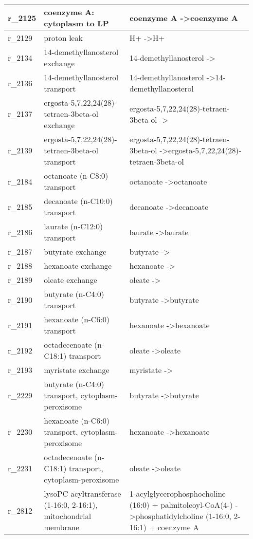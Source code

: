 \begin{landscape}
{\begin{longtable}{|l|p{7cm}|p{15cm}|}
r\_2125 & coenzyme A: cytoplasm to LP & coenzyme A  -\textgreater coenzyme A \\ \hline
r\_2129 & proton leak & H+  -\textgreater H+ \\ \hline
r\_2134 & 14-demethyllanosterol exchange & 14-demethyllanosterol  -\textgreater{} \\ \hline
r\_2136 & 14-demethyllanosterol transport & 14-demethyllanosterol  -\textgreater 14-demethyllanosterol \\ \hline
r\_2137 & ergosta-5,7,22,24(28)-tetraen-3beta-ol exchange & ergosta-5,7,22,24(28)-tetraen-3beta-ol  -\textgreater{} \\ \hline
r\_2139 & ergosta-5,7,22,24(28)-tetraen-3beta-ol transport & ergosta-5,7,22,24(28)-tetraen-3beta-ol  -\textgreater ergosta-5,7,22,24(28)-tetraen-3beta-ol \\ \hline
r\_2184 & octanoate (n-C8:0) transport & octanoate  -\textgreater octanoate \\ \hline
r\_2185 & decanoate (n-C10:0) transport & decanoate  -\textgreater decanoate \\ \hline
r\_2186 & laurate (n-C12:0) transport & laurate  -\textgreater laurate \\ \hline
r\_2187 & butyrate exchange & butyrate  -\textgreater{} \\ \hline
r\_2188 & hexanoate exchange & hexanoate  -\textgreater{} \\ \hline
r\_2189 & oleate exchange & oleate  -\textgreater{} \\ \hline
r\_2190 & butyrate (n-C4:0) transport & butyrate  -\textgreater butyrate \\ \hline
r\_2191 & hexanoate (n-C6:0) transport & hexanoate  -\textgreater hexanoate \\ \hline
r\_2192 & octadecenoate (n-C18:1) transport & oleate  -\textgreater oleate \\ \hline
r\_2193 & myristate exchange & myristate  -\textgreater{} \\ \hline
r\_2229 & butyrate (n-C4:0) transport, cytoplasm-peroxisome & butyrate  -\textgreater butyrate \\ \hline
r\_2230 & hexanoate (n-C6:0) transport, cytoplasm-peroxisome & hexanoate  -\textgreater hexanoate \\ \hline
r\_2231 & octadecenoate (n-C18:1) transport, cytoplasm-peroxisome & oleate  -\textgreater oleate \\ \hline
r\_2812 & lysoPC acyltransferase (1-16:0, 2-16:1), mitochondrial membrane & 1-acylglycerophosphocholine (16:0) + palmitoleoyl-CoA(4-)  -\textgreater phosphatidylcholine (1-16:0, 2-16:1) + coenzyme A \\ \hline

\end{longtable}}
\end{landscape}
